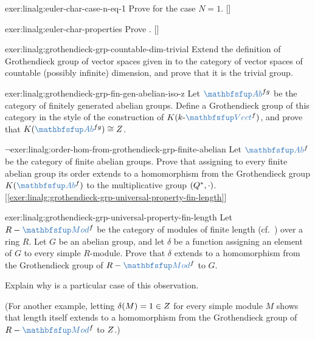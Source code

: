 \begin{exer}{\exerused}{exer:linalg:euler-char-case-n-eq-1}
  Prove  for the case $N =
  1$. []
\end{exer}
\begin{exer}{\exerused}{exer:linalg:euler-char-properties}
  Prove
  . []
\end{exer}
\begin{exer}{}{exer:linalg:grothendieck-grp-countable-dim-trivial}
  Extend the definition of Grothendieck group of vector spaces given
  in
  to the category of vector spaces of countable (possibly infinite)
  dimension, and prove that it is the trivial group.
\end{exer}
\begin{exer}{}{exer:linalg:grothendieck-grp-fin-gen-abelian-iso-z}
  Let $\categ{Ab}^{fg}$ be the category of finitely generated abelian
  groups. Define a Grothendieck group of this category in the style of
  the construction of $K(k\text{-}\categ{Vect}^f)$, and prove that
  $K(\categ{Ab}^{fg}) \cong \Z$.
\end{exer}
\begin{exer}{$\lnot$}{exer:linalg:order-hom-from-grothendieck-grp-finite-abelian}
  Let $\categ{Ab}^f$ be the category of finite abelian groups. Prove
  that assigning to every finite abelian group its order extends to a
  homomorphism from the Grothendieck group $K(\categ{Ab}^f)$ to the
  multiplicative group $(Q^*,
  \cdot)$. [\ref{exer:linalg:grothendieck-grp-universal-property-fin-length}]
\end{exer}
\begin{exer}{}{exer:linalg:grothendieck-grp-universal-property-fin-length}
  Let $R-\categ{Mod}^f$ be the category of modules of finite length
  (cf.\ ) over a ring
  $R$. Let $G$ be an abelian group, and let $\delta$ be a function
  assigning an element of $G$ to every simple $R$-module. Prove that
  $\delta$ extends to a homomorphism from the Grothendieck group of
  $R-\categ{Mod}^f$ to $G$.

  Explain why
   is
  a particular case of this observation.

  (For another example, letting $\delta(M) = 1 \in Z$ for every
  simple module $M$ shows that length itself extends to a homomorphism
  from the Grothendieck group of $R-\categ{Mod}^f$ to $Z$.)
\end{exer}

